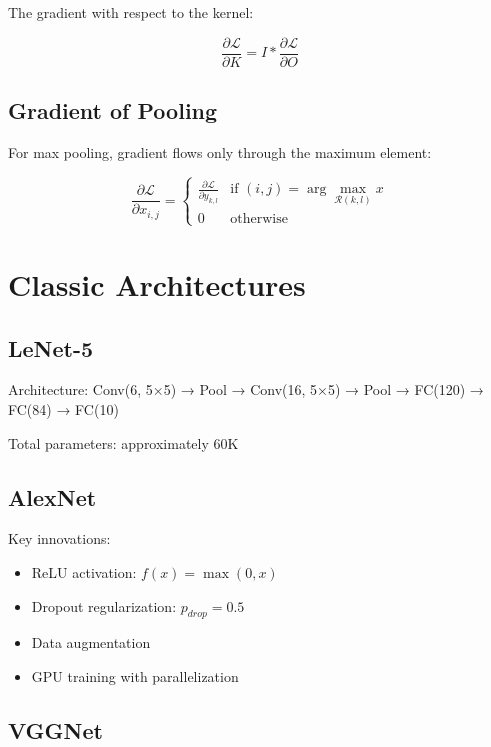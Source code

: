 \documentclass[12pt,a4paper]{article}
\begin{document}
The gradient with respect to the kernel:

\begin{equation}
\frac{\partial \mathcal{L}}{\partial K} = I * \frac{\partial \mathcal{L}}{\partial O}
\end{equation}

\subsection{Gradient of Pooling}

For max pooling, gradient flows only through the maximum element:

\begin{equation}
\frac{\partial \mathcal{L}}{\partial x_{i,j}} = \begin{cases}
\frac{\partial \mathcal{L}}{\partial y_{k,l}} & \text{if } (i,j) = \arg\max_{\mathcal{R}(k,l)} x \\
0 & \text{otherwise}
\end{cases}
\end{equation}

\section{Classic Architectures}

\subsection{LeNet-5}

Architecture: Conv(6, 5×5) → Pool → Conv(16, 5×5) → Pool → FC(120) → FC(84) → FC(10)

Total parameters: approximately 60K

\subsection{AlexNet}

Key innovations:
\begin{itemize}
    \item ReLU activation: $f(x) = \max(0, x)$
    \item Dropout regularization: $p_{drop} = 0.5$
    \item Data augmentation
    \item GPU training with parallelization
\end{itemize}

\subsection{VGGNet}
\end{document}
